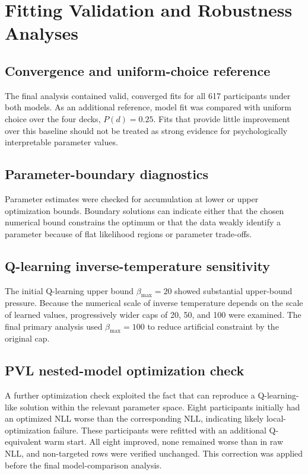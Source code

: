 \section{Fitting Validation and Robustness Analyses}
\subsection{Convergence and uniform-choice reference}

The final analysis contained valid, converged fits for all 617 participants under both models. As an additional reference, model fit was compared with uniform choice over the four decks, \(P(d)=0.25\). Fits that provide little improvement over this baseline should not be treated as strong evidence for psychologically interpretable parameter values.

\subsection{Parameter-boundary diagnostics}

Parameter estimates were checked for accumulation at lower or upper optimization bounds. Boundary solutions can indicate either that the chosen numerical bound constrains the optimum or that the data weakly identify a parameter because of flat likelihood regions or parameter trade-offs.

\subsection{Q-learning inverse-temperature sensitivity}

The initial Q-learning upper bound \(\beta_{\max}=20\) showed substantial upper-bound pressure. Because the numerical scale of inverse temperature depends on the scale of learned values, progressively wider caps of 20, 50, and 100 were examined. The final primary analysis used \(\beta_{\max}=100\) to reduce artificial constraint by the original cap.

\subsection{PVL nested-model optimization check}

A further optimization check exploited the fact that \PVL{} can reproduce a Q-learning-like solution within the relevant parameter space. Eight participants initially had an optimized \PVL{} NLL worse than the corresponding \QL{} NLL, indicating likely local-optimization failure. These participants were refitted with an additional Q-equivalent warm start. All eight improved, none remained worse than \QL{} in raw NLL, and non-targeted rows were verified unchanged. This correction was applied before the final model-comparison analysis.
